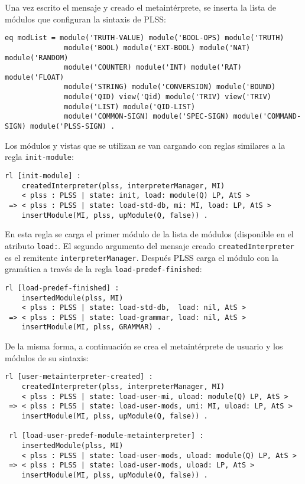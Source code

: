 Una vez escrito el mensaje y creado el metaintérprete, se inserta la lista de módulos que configuran la sintaxis de PLSS:
\begin{lstlisting}[language=Maude]
 eq modList = module('TRUTH-VALUE) module('BOOL-OPS) module('TRUTH)
              module('BOOL) module('EXT-BOOL) module('NAT) module('RANDOM)
              module('COUNTER) module('INT) module('RAT) module('FLOAT)
              module('STRING) module('CONVERSION) module('BOUND) 
              module('QID) view('Qid) module('TRIV) view('TRIV)
              module('LIST) module('QID-LIST) 
              module('COMMON-SIGN) module('SPEC-SIGN) module('COMMAND-SIGN) module('PLSS-SIGN) .
\end{lstlisting}
\medskip
Los módulos y vistas que se utilizan se van cargando con reglas similares a la regla \texttt{init-module}:
\begin{lstlisting}[language=Maude]
 rl [init-module] :
    createdInterpreter(plss, interpreterManager, MI)
    < plss : PLSS | state: init, load: module(Q) LP, AtS >
 => < plss : PLSS | state: load-std-db, mi: MI, load: LP, AtS >
    insertModule(MI, plss, upModule(Q, false)) .
\end{lstlisting}
En esta regla se carga el primer módulo de la lista de módulos (disponible en el atributo \texttt{load:}. El segundo argumento del mensaje creado \texttt{createdInterpreter} es el remitente \texttt{interpreterManager}.
Después PLSS carga el módulo con la gramática a través de la regla \texttt{load-predef-finished}:
\begin{lstlisting}[language=Maude]
 rl [load-predef-finished] :
    insertedModule(plss, MI)
    < plss : PLSS | state: load-std-db,  load: nil, AtS > 
 => < plss : PLSS | state: load-grammar, load: nil, AtS >
    insertModule(MI, plss, GRAMMAR) .
\end{lstlisting}
\medskip

De la misma forma, a continuación se crea el metaintérprete de usuario y los módulos de su sintaxis:
\begin{lstlisting}[language=Maude]
 rl [user-metainterpreter-created] :
    createdInterpreter(plss, interpreterManager, MI)
    < plss : PLSS | state: load-user-mi, uload: module(Q) LP, AtS >
 => < plss : PLSS | state: load-user-mods, umi: MI, uload: LP, AtS >
    insertModule(MI, plss, upModule(Q, false)) .

 rl [load-user-predef-module-metainterpreter] :
    insertedModule(plss, MI)
    < plss : PLSS | state: load-user-mods, uload: module(Q) LP, AtS >
 => < plss : PLSS | state: load-user-mods, uload: LP, AtS >
    insertModule(MI, plss, upModule(Q, false)) .
\end{lstlisting}
\medskip



